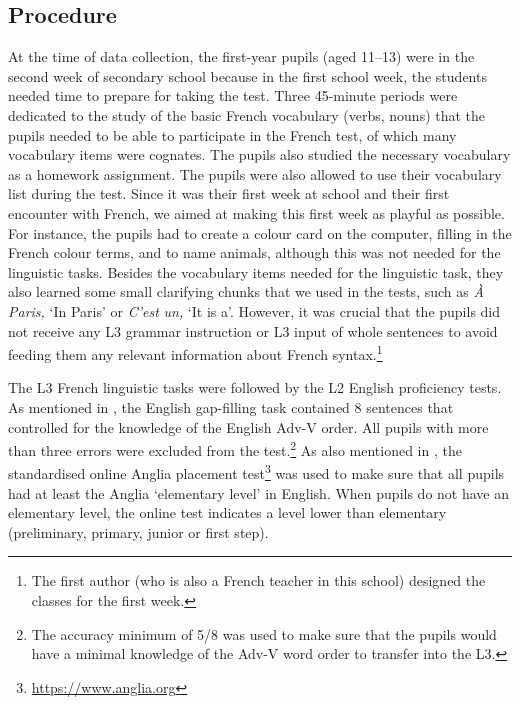 \documentclass[output=paper,modfonts,nonflat, newtxmath]{langsci/langscibook}
\begin{document}
\subsection{{Procedure}}
\label{sec:stadt:3.4}

At the time of data collection, the first-year pupils (aged 11–13) were in the second week of secondary school because in the first school week, the students needed time to prepare for taking the test. Three 45-minute periods were dedicated to the study of the basic French vocabulary (verbs, nouns) that the pupils needed to be able to participate in the French test, of which many vocabulary items were cognates. The pupils also studied the necessary vocabulary as a homework assignment. The pupils were also allowed to use their vocabulary list during the test. Since it was their first week at school and their first encounter with French, we aimed at making this first week as playful as possible. For instance, the pupils had to create a colour card on the computer, filling in the French colour terms, and to name animals, although this was not needed for the linguistic tasks. Besides the vocabulary items needed for the linguistic task, they also learned some small clarifying chunks that we used in the tests, such as \textit{À} \textit{Paris,} ‘In Paris’ or \textit{C’est} \textit{un,} ‘It is a’. However, it was crucial that the pupils did not receive any L3 grammar instruction or L3 input of whole sentences to avoid feeding them any relevant information about French syntax.\footnote{ \textrm{The first author (who is also a French teacher in this school) designed the classes for the first week.} }

The L3 French linguistic tasks were followed by the L2 English proficiency tests. As mentioned in , the English gap-filling task contained 8 sentences that controlled for the knowledge of the English Adv-V order. All pupils with more than three errors were excluded from the test.\footnote{ \textrm{The accuracy minimum of 5/8 was used to make sure that the pupils would have a minimal knowledge of the Adv-V word order to transfer into the L3.} } As also mentioned in , the standardised online Anglia placement test\footnote{\url{https://www.anglia.org}} was used to make sure that all pupils had at least the Anglia ‘elementary level’ in English. When pupils do not have an elementary level, the online test indicates a level lower than elementary (preliminary, primary, junior or first step).
\end{document}

